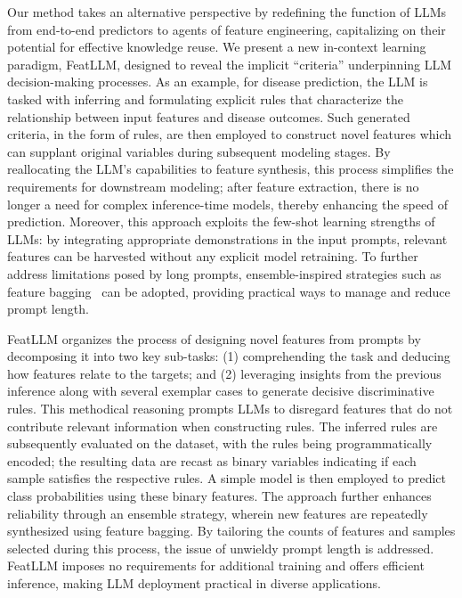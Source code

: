 Our method takes an alternative perspective by redefining the function of LLMs from end-to-end predictors to agents of feature engineering, capitalizing on their potential for effective knowledge reuse. We present a new in-context learning paradigm, \textsf{FeatLLM}, designed to reveal the implicit “criteria” underpinning LLM decision-making processes. As an example, for disease prediction, the LLM is tasked with inferring and formulating explicit rules that characterize the relationship between input features and disease outcomes. Such generated criteria, in the form of rules, are then employed to construct novel features which can supplant original variables during subsequent modeling stages. By reallocating the LLM's capabilities to feature synthesis, this process simplifies the requirements for downstream modeling; after feature extraction, there is no longer a need for complex inference-time models, thereby enhancing the speed of prediction. Moreover, this approach exploits the few-shot learning strengths of LLMs: by integrating appropriate demonstrations in the input prompts, relevant features can be harvested without any explicit model retraining. To further address limitations posed by long prompts, ensemble-inspired strategies such as feature bagging~\cite{breiman2001random} can be adopted, providing practical ways to manage and reduce prompt length.

\textsf{FeatLLM} organizes the process of designing novel features from prompts by decomposing it into two key sub-tasks: (1) comprehending the task and deducing how features relate to the targets; and (2) leveraging insights from the previous inference along with several exemplar cases to generate decisive discriminative rules. This methodical reasoning prompts LLMs to disregard features that do not contribute relevant information when constructing rules. The inferred rules are subsequently evaluated on the dataset, with the rules being programmatically encoded; the resulting data are recast as binary variables indicating if each sample satisfies the respective rules. A simple model is then employed to predict class probabilities using these binary features. The approach further enhances reliability through an ensemble strategy, wherein new features are repeatedly synthesized using feature bagging. By tailoring the counts of features and samples selected during this process, the issue of unwieldy prompt length is addressed. \textsf{FeatLLM} imposes no requirements for additional training and offers efficient inference, making LLM deployment practical in diverse applications.

